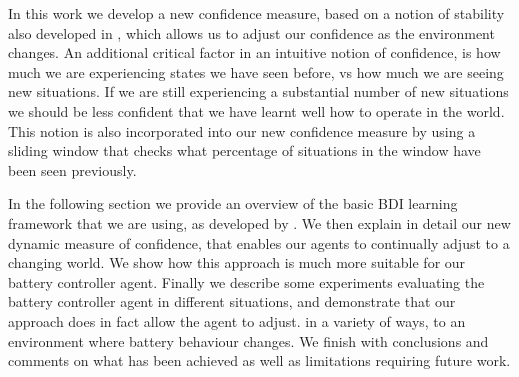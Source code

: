 In this work we develop a new confidence measure, based on a notion of
stability also developed in \cite{}, which allows us to adjust our
confidence as the environment changes.  An additional critical factor in
an intuitive notion of confidence, is how much we are experiencing
states we have seen before, vs how much we are seeing new
situations. If we are still experiencing a substantial number of new
situations we should be less confident that we have learnt well how to
operate in the world. This notion is also incorporated into our new
confidence measure by using a sliding window that checks what
percentage of situations in the window have been seen previously.

In the following section we provide an overview of the basic BDI
learning framework that we are using, as developed by \cite{}. We then
explain in detail our new dynamic measure of confidence, that enables
our agents to continually adjust to a changing world. We show how this
approach is much more suitable for our battery controller
agent. Finally we describe some experiments evaluating the battery
controller agent in different situations, and demonstrate that our
approach does in fact allow the agent to adjust. in a variety of ways,
to an environment where battery behaviour changes. We finish with
conclusions and comments on what has been achieved as well as
limitations requiring future work.
